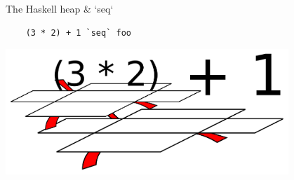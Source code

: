 \documentclass[20pt]{beamer}
\begin{document}
\begin{frame}[fragile]{The Haskell heap \& `seq`}
    \begin{lstlisting}
    (3 * 2) + 1 `seq` foo
    \end{lstlisting}
    \begin{center}
    \includegraphics[width=0.8\textwidth]{images/g-f-3-eval-2.pdf}
    \end{center}
\end{frame}
\end{document}
